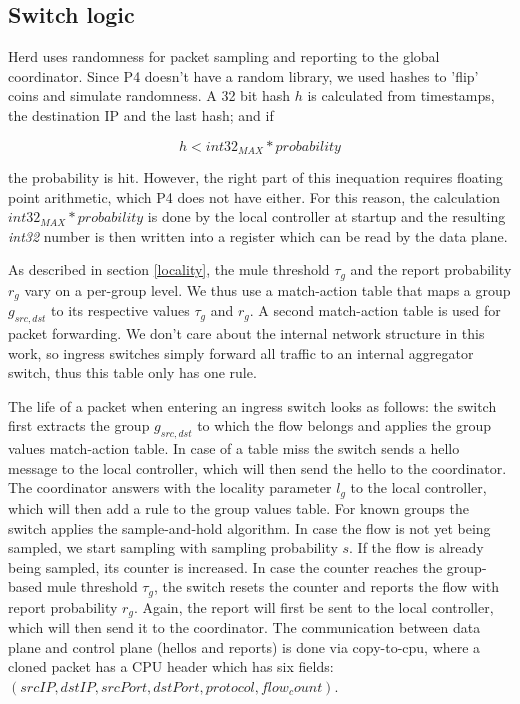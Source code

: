\documentclass[11pt,oneside,a4paper]{article}
\begin{document}
\subsection{Switch logic} \label{switch}
Herd uses randomness for packet sampling and reporting to the global coordinator. Since P4 doesn't have a random library, we used hashes to 'flip' coins and simulate randomness.
\noindent A  32 bit hash $h$ is calculated from timestamps, the destination IP and the last hash; and if

$$h < int32_{MAX} * probability$$

\noindent the probability is hit. However, the right part of this inequation requires floating point arithmetic, which P4 does not have either. For this reason, the calculation $int32_{MAX} * probability$ is done by the local controller at startup and the resulting \textit{int32} number is then written into a register which can be read by the data plane.

As described in section \ref{locality}, the mule threshold $\tau_g$ and the report probability $r_g$ vary on a per-group level. We thus use a match-action table that maps a group $g_{src,dst}$ to its respective values $\tau_g$ and $r_g$. A second match-action table is used for packet forwarding. We don't care about the internal network structure in this work, so ingress switches simply forward all traffic to an internal aggregator switch, thus this table only has one rule.

The life of a packet when entering an ingress switch looks as follows: the switch first extracts the group $g_{src,dst}$ to which the flow belongs and applies the group values match-action table. In case of a table miss the switch sends a hello message to the local controller, which will then send the hello to the coordinator. The coordinator answers with the locality parameter $l_g$ to the local controller, which will then add a rule to the group values table. For known groups the switch applies the sample-and-hold algorithm. In case the flow is not yet being sampled, we start sampling with sampling probability $s$. If the flow is already being sampled, its counter is increased. In case the counter reaches the group-based mule threshold $\tau_g$, the switch resets the counter and reports the flow with report probability $r_g$. Again, the report will first be sent to the local controller, which will then send it to the coordinator. The communication between data plane and control plane (hellos and reports) is done via copy-to-cpu, where a cloned packet has a CPU header which has six fields: $(srcIP, dstIP, srcPort, dstPort, protocol, flow_count)$.
\end{document}
